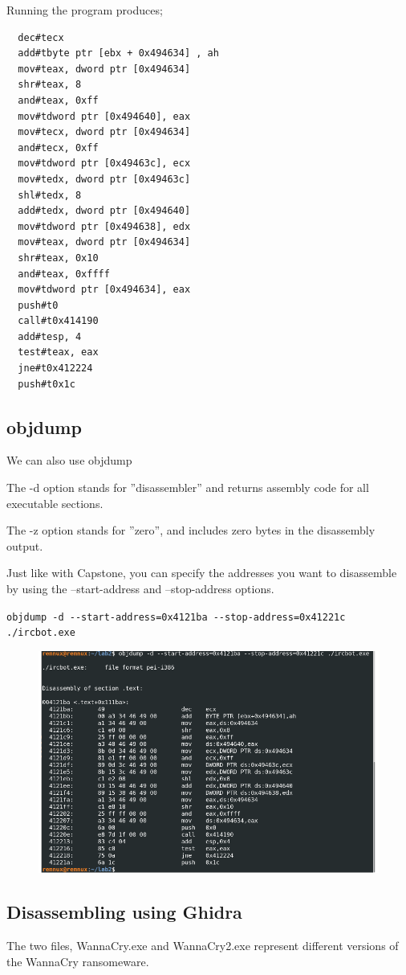 \documentclass[]{project_plan}
\begin{document}
Running the program produces;
\begin{lstlisting}
  dec#tecx
  add#tbyte ptr [ebx + 0x494634] , ah
  mov#teax, dword ptr [0x494634]
  shr#teax, 8
  and#teax, 0xff
  mov#tdword ptr [0x494640], eax
  mov#tecx, dword ptr [0x494634]
  and#tecx, 0xff
  mov#tdword ptr [0x49463c], ecx
  mov#tedx, dword ptr [0x49463c]
  shl#tedx, 8
  add#tedx, dword ptr [0x494640]
  mov#tdword ptr [0x494638], edx
  mov#teax, dword ptr [0x494634]
  shr#teax, 0x10
  and#teax, 0xffff
  mov#tdword ptr [0x494634], eax
  push#t0
  call#t0x414190
  add#tesp, 4
  test#teax, eax
  jne#t0x412224
  push#t0x1c
\end{lstlisting}

\subsection{objdump}
We can also use objdump

The -d option stands for ”disassembler” and returns assembly code for all
executable sections.

The -z option stands for ”zero”, and includes zero bytes in the disassembly
output.

Just like with Capstone, you can specify the addresses you want to disassemble
by using the --start-address and --stop-address options.

\lstinline|objdump -d --start-address=0x4121ba --stop-address=0x41221c ./ircbot.exe|

\begin{figure}[H]
  \centering
  \includegraphics[width=\linewidth]{lab2_objdump.png}
\end{figure}


\subsection{Disassembling using Ghidra}
The two files, WannaCry.exe and WannaCry2.exe  represent different versions
of the WannaCry ransomeware.
\end{document}
